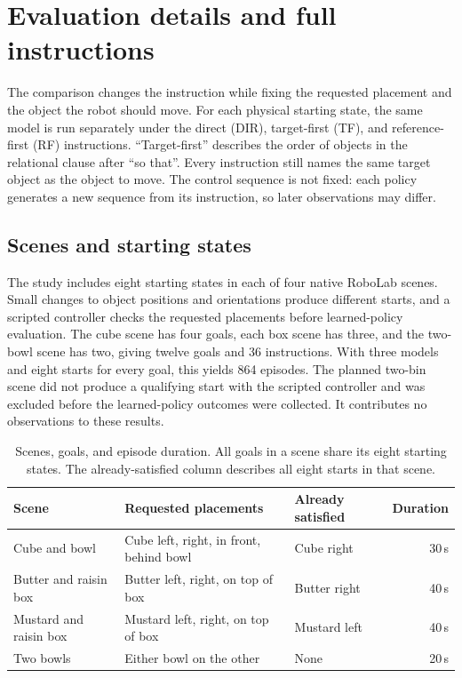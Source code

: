 \documentclass{article}
\begin{document}
\setlength{\parskip}{5.5pt}
\section{Evaluation details and full instructions}
\label{app:tasks}
The comparison changes the instruction while fixing the requested placement and the object the robot should move. For each physical starting state, the same model is run separately under the direct (DIR), target-first (TF), and reference-first (RF) instructions. ``Target-first'' describes the order of objects in the relational clause after ``so that''. Every instruction still names the same target object as the object to move. The control sequence is not fixed: each policy generates a new sequence from its instruction, so later observations may differ.

\subsection{Scenes and starting states}
The study includes eight starting states in each of four native RoboLab scenes. Small changes to object positions and orientations produce different starts, and a scripted controller checks the requested placements before learned-policy evaluation. The cube scene has four goals, each box scene has three, and the two-bowl scene has two, giving twelve goals and 36 instructions. With three models and eight starts for every goal, this yields 864 episodes. The planned two-bin scene did not produce a qualifying start with the scripted controller and was excluded before the learned-policy outcomes were collected. It contributes no observations to these results.

\begin{table}[htbp]
\centering\small
\caption{Scenes, goals, and episode duration. All goals in a scene share its eight starting states. The already-satisfied column describes all eight starts in that scene.}
\label{tab:appendix-scenes}
\begin{tabular}{@{}p{.25\linewidth}p{.36\linewidth}p{.20\linewidth}r@{}}
\toprule Scene & Requested placements & Already satisfied & Duration\\
\midrule
Cube and bowl & Cube left, right, in front, behind bowl & Cube right & 30\,s\\
Butter and raisin box & Butter left, right, on top of box & Butter right & 40\,s\\
Mustard and raisin box & Mustard left, right, on top of box & Mustard left & 40\,s\\
Two bowls & Either bowl on the other & None & 20\,s\\
\bottomrule
\end{tabular}
\end{table}
\end{document}
